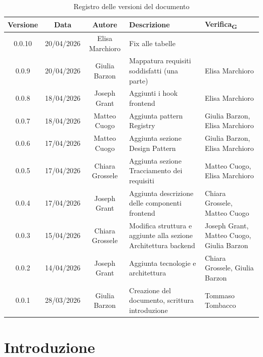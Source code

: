 \documentclass[11pt,a4paper]{article}
\newcommand{\gls}[1]{#1\textsubscript{G}}
\begin{document}
\begin{table}[H]
    \centering          
    \begin{tabular}{|c|c|c|>{\raggedright\arraybackslash}p{}|p{}|}
        \hline
        \textbf{Versione} & \textbf{Data} & \textbf{Autore} & \textbf{Descrizione} & \textbf{\gls{Verifica}} \\
        \hline
        0.0.10 & 20/04/2026 & Elisa Marchioro & Fix alle tabelle & \\
        \hline
        0.0.9 & 20/04/2026 & Giulia Barzon & Mappatura requisiti soddisfatti (una parte) & Elisa Marchioro\\
        \hline
        0.0.8 & 18/04/2026 & Joseph Grant & Aggiunti i hook frontend & Elisa Marchioro\\
        \hline
        0.0.7 & 18/04/2026 & Matteo Cuogo & Aggiunta pattern Registry & Giulia Barzon, Elisa Marchioro\\
        \hline
        0.0.6 & 17/04/2026 & Matteo Cuogo & Aggiunta sezione Design Pattern & Giulia Barzon, Elisa Marchioro\\
        \hline
        0.0.5 & 17/04/2026 & Chiara Grossele & Aggiunta sezione Tracciamento dei requisiti & Matteo Cuogo, Elisa Marchioro\\
        \hline
        0.0.4 & 17/04/2026 & Joseph Grant & Aggiunta descrizione delle componenti frontend & Chiara Grossele, Matteo Cuogo\\
        \hline
        0.0.3 & 15/04/2026 & Chiara Grossele & Modifica struttura e aggiunte alla sezione Architettura backend & Joseph Grant, Matteo Cuogo, Giulia Barzon \\
        \hline
        0.0.2 & 14/04/2026 & Joseph Grant & Aggiunta tecnologie e architettura & Chiara Grossele, Giulia Barzon\\
        \hline
        0.0.1 & 28/03/2026 & Giulia Barzon & Creazione del documento, scrittura introduzione & Tommaso Tombacco \\
        \hline
    \end{tabular}
    \caption{Registro delle versioni del documento}
    \label{tab:versionamento}
\end{table}
\newpage

\tableofcontents
\thispagestyle{empty}
\newpage

\setcounter{page}{1}

\section{Introduzione}
\end{document}
